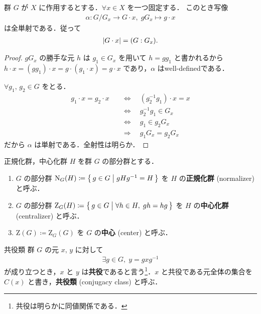 \documentclass[geometry_main]{subfiles}
\begin{document}
\begin{myprop}[]{}
	群 $G$ が $X$ に作用するとする．$\forall x \in X$ を一つ固定する．
	このとき写像
	\begin{align}
		\alpha \colon G/G_x \to G \cdot x,\; gG_x \mapsto g\cdot x
	\end{align}
	は全単射である．従って
	\begin{align}
		\abs{G \cdot x} = (G:G_x).
	\end{align}
\end{myprop}

\begin{proof}
	$gG_x$ の勝手な元 $h$ は $g_1 \in G_x$ を用いて $h = gg_1$ と書かれるから $h \cdot x = (gg_1) \cdot x = g \cdot (g_1 \cdot x) = g \cdot x$ であり，$\alpha$ はwell-definedである．

	$\forall g_1,\, g_2 \in G$ をとる．
	\begin{align}
		g_1 \cdot x = g_2  \cdot x \quad &\Longleftrightarrow \quad (g_2^{-1} g_1 ) \cdot x = x \\
		&\Longleftrightarrow \quad g_2^{-1} g_1  \in G_x \\
		&\Longleftrightarrow \quad g_1 \in g_2 G_x \\
		&\Longrightarrow \quad g_1 G_x = g_2 G_x
	\end{align}
	だから $\alpha$ は単射である．全射性は明らか．
\end{proof}

\begin{mydef}[label=def.center]{正規化群，中心化群}
	$H$ を群 $G$ の部分群とする．
	\begin{enumerate}
		\item $G$ の部分群 $\mathrm{N}_G(H) \coloneqq \bigl\{\, g\in G \bigm| gHg^{-1} = H \,\bigr\} $ を $H$ の\textbf{正規化群} (normalizer) と呼ぶ．
		\item $G$ の部分群 $\mathrm{Z}_G(H) \coloneqq \bigl\{\, g\in G \bigm| \forall h \in H,\; gh = hg \,\bigr\} $ を $H$ の\textbf{中心化群} (centralizer) と呼ぶ．
		\item $\mathrm{Z}(G) \coloneqq \mathrm{Z}_G(G)$ を $G$ の\textbf{中心} (center) と呼ぶ．
	\end{enumerate}
\end{mydef}

\begin{mydef}[label=def.conjugation]{共役類}
	群 $G$ の元 $x,\, y$ に対して
	\begin{align}
		\exists g \in G,\; y = gxg^{-1}
	\end{align}
	が成り立つとき，$x$ と $y$ は\textbf{共役}であると言う\footnote{共役は明らかに同値関係である．}．$x$ と共役である元全体の集合を $C(x)$ と書き，\textbf{共役類} (conjugacy class) と呼ぶ．
\end{mydef}
\end{document}
